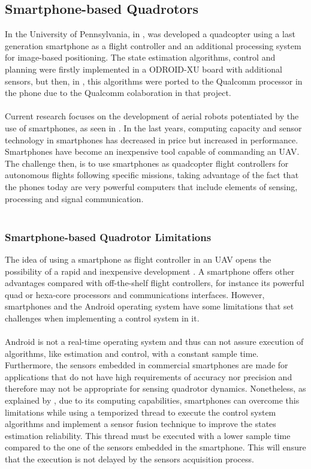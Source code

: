 \subsection{Smartphone-based Quadrotors}
In the University of Pennsylvania, in \cite{Loianno2015}, was developed a quadcopter using a last generation smartphone as a flight controller and an additional processing system for image-based positioning. The state estimation algorithms, control and planning were firstly implemented in a ODROID-XU board with additional sensors, but then, in \cite{Loianno2015a}, this algorithms were ported to the Qualcomm processor in the phone due to the Qualcomm colaboration in that project.
\\\\
Current research focuses on the development of aerial robots potentiated by the use of smartphones, as seen in \cite{Pearce2014a, ALEMARK2014a, Aldrovandi2015, Bryant2015}. In the last years, computing capacity and sensor technology in smartphones has decreased in price but increased in performance. Smartphones have become an inexpensive tool capable of commanding an UAV. The challenge then, is to use smartphones as quadcopter flight controllers for autonomous flights following specific missions, taking advantage of the fact that the phones today are very powerful computers that include elements of sensing, processing and signal communication.
\\\\

\subsubsection{Smartphone-based Quadrotor Limitations}
The idea of using a smartphone as flight controller in an UAV opens the possibility of a rapid and inexpensive development \cite{Aldrovandi2015}. A smartphone offers other advantages compared with off-the-shelf flight controllers, for instance its powerful quad or hexa-core processors and communications interfaces. However, smartphones and the Android operating system have some limitations that set challenges when implementing a control system in it.\\\\
Android is not a real-time operating system and thus can not assure execution of algorithms, like estimation and control, with a constant sample time. Furthermore, the sensors embedded in commercial smartphones are made for applications that do not have high requirements of accuracy nor precision and therefore may not be appropriate for sensing quadrotor dynamics. Nonetheless, as explained by \cite{Bryant2015}, due to its computing capabilities, smartphones can overcome this limitations while using a temporized thread to execute the control system algorithms and implement a sensor fusion technique to improve the states estimation reliability. This thread must be executed with a lower sample time compared to the one of the sensors embedded in the smartphone. This will ensure that the execution is not delayed by the sensors acquisition process.

